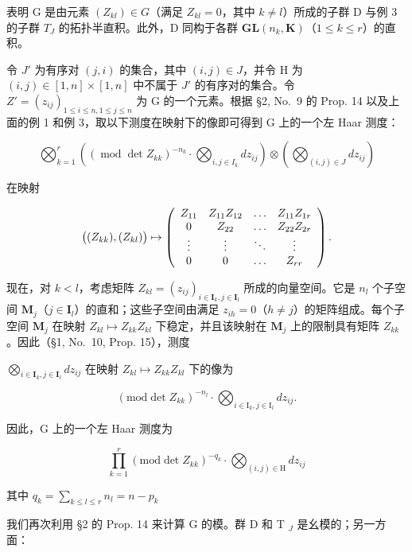 表明 G 是由元素 \((Z_{kl}) \in G\)（满足 \(Z_{kl} = 0\)，其中 \(k \neq l\)）所成的子群 D 与例 3 的子群 \(T_{J}\) 的拓扑半直积。此外，D 同构于各群 \(\mathbf{GL}(n_{k}, \mathbf{K})\)（\(1 \leqslant k \leqslant r\)）的直积。

令 \(J'\) 为有序对 \((j, i)\) 的集合，其中 \((i, j) \in J\)，并令 H 为 \((i, j) \in [1, n] \times [1, n]\) 中不属于 \(J'\) 的有序对的集合。令 \(Z' = (z_{ij})_{1 \leqslant i \leqslant n, 1 \leqslant j \leqslant n}\) 为 G 的一个元素。根据 §2, No.~9 的 Prop. 14 以及上面的例 1 和例 3，取以下测度在映射下的像即可得到 G 上的一个左 Haar 测度：

\[
\bigotimes_ {k = 1} ^ {r} \left(\left(\operatorname{mod} \det Z _ {k k}\right) ^ {- n _ {k}} \cdot \bigotimes_ {i, j \in I _ {k}} d z _ {i j}\right) \otimes \left(\bigotimes_ {(i, j) \in J} d z _ {i j}\right)
\]

在映射

\[
\bigl ((Z _ {k k}), (Z _ {k l}) \bigr) \mapsto \left( \begin{array}{c c c c} Z _ {1 1} & Z _ {1 1} Z _ {1 2} & \ldots & Z _ {1 1} Z _ {1 r} \\ 0 & Z _ {2 2} & \ldots & Z _ {2 2} Z _ {2 r} \\ \vdots & \vdots & \ddots & \vdots \\ 0 & 0 & \ldots & Z _ {r r} \end{array} \right).
\]

现在，对 \(k < l\)，考虑矩阵 \(Z_{kl} = (z_{ij})_{i \in \mathbf{I}_k, j \in \mathbf{I}_l}\) 所成的向量空间。它是 \(n_l\) 个子空间 \(\mathbf{M}_j\)（\(j \in \mathbf{I}_l\)）的直和；这些子空间由满足 \(z_{ih} = 0\)（\(h \neq j\)）的矩阵组成。每个子空间 \(\mathbf{M}_j\) 在映射 \(Z_{kl} \mapsto Z_{kk}Z_{kl}\) 下稳定，并且该映射在 \(\mathbf{M}_j\) 上的限制具有矩阵 \(Z_{kk}\)。因此（§1, No.~10, Prop. 15），测度

\(\bigotimes_{i \in \mathbf{I}_k, j \in \mathbf{I}_l} dz_{ij}\) 在映射 \(Z_{kl} \mapsto Z_{kk} Z_{kl}\) 下的像为

\[
(\mathrm{mod} \det Z _ {k k}) ^ {- n _ {l}} \cdot \bigotimes_ {i \in \mathrm{I} _ {k}, j \in \mathrm{I} _ {l}} d z _ {i j}.
\]

因此，G 上的一个左 Haar 测度为

\[
\prod_ {k = 1} ^ {r} (\mathrm{mod} \det Z _ {k k}) ^ {- q _ {k}} \cdot \bigotimes_ {(i, j) \in \mathrm{H}} d z _ {i j}\tag{9}
\]

其中 \(q_{k} = \sum_{k\leqslant l\leqslant r}n_{l} = n - p_{k}\)

我们再次利用 §2 的 Prop. 14 来计算 G 的模。群 D 和 T \(_{J}\) 是幺模的；另一方面：

